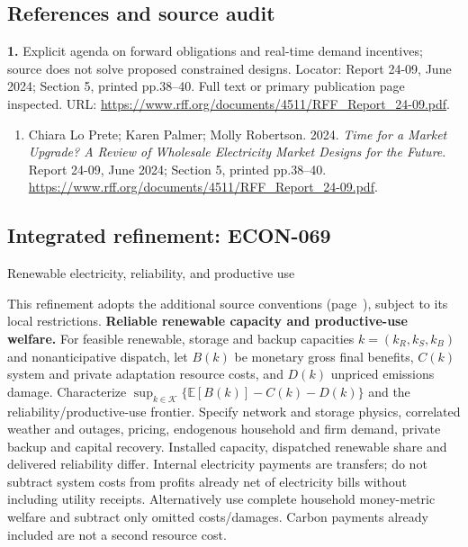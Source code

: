 \documentclass[11pt,a4paper]{article}
\begin{document}
\subsection*{References and source audit}
\textbf{1.} Explicit agenda on forward obligations and real-time demand incentives; source does not solve proposed constrained designs. Locator: Report 24-09, June 2024; Section 5, printed pp.38–40. Full text or primary publication page inspected. URL: \url{https://www.rff.org/documents/4511/RFF_Report_24-09.pdf}.
\begin{enumerate}\raggedright
\item\hypertarget{definitions:source:30007719:1}{} Chiara Lo Prete; Karen Palmer; Molly Robertson. 2024. \emph{Time for a Market Upgrade? A Review of Wholesale Electricity Market Designs for the Future}. Report 24-09, June 2024; Section 5, printed pp.38–40.
\url{https://www.rff.org/documents/4511/RFF_Report_24-09.pdf}.
\end{enumerate}

\subsection*{Integrated refinement: ECON-069}
{\sffamily\small\color{muted}Renewable electricity, reliability, and productive use\par}
This refinement adopts the additional source conventions
(page~\pageref{audited:conventions}), subject to its local restrictions.
\textbf{Reliable renewable capacity and productive-use welfare.}
For feasible renewable, storage and backup capacities $k=(k_R,k_S,k_B)$ and
nonanticipative dispatch, let $B(k)$ be monetary gross final benefits,
$C(k)$ system and private adaptation resource costs, and $D(k)$ unpriced emissions
damage. Characterize $\sup_{k\in\mathcal K}\{\mathbb E[B(k)]-C(k)-D(k)\}$ and
the reliability/productive-use frontier. Specify network and storage physics,
correlated weather and outages, pricing, endogenous household and firm demand,
private backup and capital recovery. Installed capacity, dispatched renewable
share and delivered reliability differ. Internal electricity payments are
transfers; do not subtract system costs from profits already net of electricity
bills without including utility receipts. Alternatively use complete household
money-metric welfare and subtract only omitted costs/damages. Carbon payments
already included are not a second resource cost.
\end{document}
